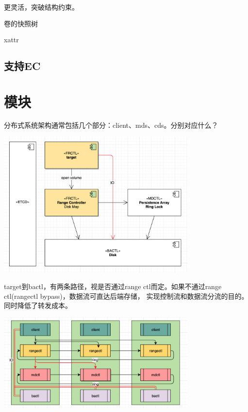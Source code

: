 更灵活，突破结构约束。

\begin{enumbox}
\item 卷的快照树
\item xattr
\end{enumbox}

\subsection{支持EC}

\section{模块}

分布式系统架构通常包括几个部分：client、mds、cds。分别对应什么？
\begin{center}
\includegraphics[width=10cm]{../imgs/arch/modules.png}
\end{center}

target到bactl，有两条路径，视是否通过range ctl而定。如果不通过range ctl(rangectl bypass)，数据流可直达后端存储，
实现控制流和数据流分流的目的。同时降低了转发成本。

\begin{center}
\includegraphics[width=10cm]{../imgs/message-flow.png}
\end{center}

